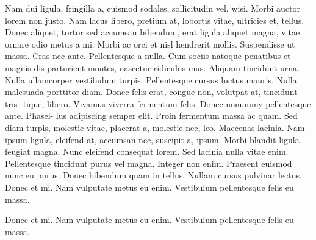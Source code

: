 Nam dui ligula, fringilla a, euismod sodales, sollicitudin vel, wisi. Morbi auctor lorem non justo. Nam lacus libero, pretium at, lobortis vitae, ultricies et, tellus. Donec aliquet, tortor sed accumsan bibendum, erat ligula aliquet magna, vitae ornare odio metus a mi. Morbi ac orci et nisl hendrerit mollis. Suspendisse ut massa. Cras nec ante. Pellentesque a nulla. Cum sociis natoque penatibus et magnis dis parturient montes, nascetur ridiculus mus. Aliquam tincidunt urna. Nulla ullamcorper vestibulum turpis. Pellentesque cursus luctus mauris.
Nulla malesuada porttitor diam. Donec felis erat, congue non, volutpat at, tincidunt tris- tique, libero. Vivamus viverra fermentum felis. Donec nonummy pellentesque ante. Phasel- lus adipiscing semper elit. Proin fermentum massa ac quam. Sed diam turpis, molestie vitae, placerat a, molestie nec, leo. Maecenas lacinia. Nam ipsum ligula, eleifend at, accumsan nec, suscipit a, ipsum. Morbi blandit ligula feugiat magna. Nunc eleifend consequat lorem. Sed lacinia nulla vitae enim. Pellentesque tincidunt purus vel magna. Integer non enim. Praesent euismod nunc eu purus. Donec bibendum quam in tellus. Nullam cursus pulvinar lectus. Donec et mi. Nam vulputate metus eu enim. Vestibulum pellentesque felis eu massa.

\begin{definition}[Lipsum]
Donec et mi. Nam vulputate metus eu enim. Vestibulum pellentesque felis eu massa.
\end{definition}


\lipsum[4-7]

